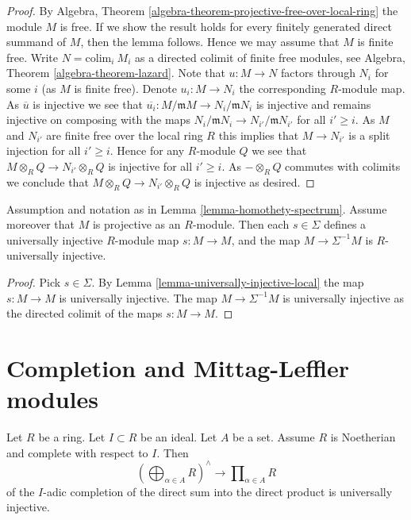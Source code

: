 \begin{proof}
By
Algebra, Theorem \ref{algebra-theorem-projective-free-over-local-ring}
the module $M$ is free. If we show the result holds for every finitely
generated direct summand of $M$, then the lemma follows. Hence we may
assume that $M$ is finite free. Write $N = \text{colim}_i\ M_i$ as
a directed colimit of finite free modules, see
Algebra, Theorem \ref{algebra-theorem-lazard}.
Note that $u : M \to N$ factors through $N_i$ for some $i$ (as $M$ is finite
free). Denote $u_i : M \to N_i$ the corresponding $R$-module map.
As $\overline{u}$ is injective we see that
$\overline{u_i} : M/\mathfrak mM \to N_i/\mathfrak mN_i$ is
injective and remains injective on composing with the maps
$N_i/\mathfrak mN_i \to N_{i'}/\mathfrak mN_{i'}$ for all $i' \geq i$.
As $M$ and $N_{i'}$ are finite free over the local ring $R$ this implies
that $M \to N_{i'}$ is a split injection for all $i' \geq i$. Hence
for any $R$-module $Q$ we see that $M \otimes_R Q \to N_{i'} \otimes_R Q$
is injective for all $i' \geq i$. As $- \otimes_R Q$ commutes with
colimits we conclude that $M \otimes_R Q \to N_{i'} \otimes_R Q$
is injective as desired.
\end{proof}

\begin{lemma}
\label{lemma-invert-universally-injective}
Assumption and notation as in
Lemma \ref{lemma-homothety-spectrum}.
Assume moreover that $M$ is projective as an $R$-module.
Then each $s \in \Sigma$ defines a
universally injective $R$-module map $s : M \to M$, and the
map $M \to \Sigma^{-1}M$ is $R$-universally injective.
\end{lemma}

\begin{proof}
Pick $s \in \Sigma$. By
Lemma \ref{lemma-universally-injective-local}
the map $s : M \to M$ is universally injective.
The map $M \to \Sigma^{-1}M$ is universally injective as the directed
colimit of the maps $s : M \to M$.
\end{proof}






\section{Completion and Mittag-Leffler modules}
\label{section-completion-ML}

\begin{lemma}
\label{lemma-universally-injective-completion-direct-sum-into-product}
Let $R$ be a ring.
Let $I \subset R$ be an ideal.
Let $A$ be a set.
Assume $R$ is Noetherian and complete with respect to $I$. Then
$$
\left(\bigoplus\nolimits_{\alpha \in A} R\right)^\wedge
\longrightarrow
\prod\nolimits_{\alpha \in A} R
$$
of the $I$-adic completion of the direct sum into the
direct product is universally injective.
\end{lemma}

